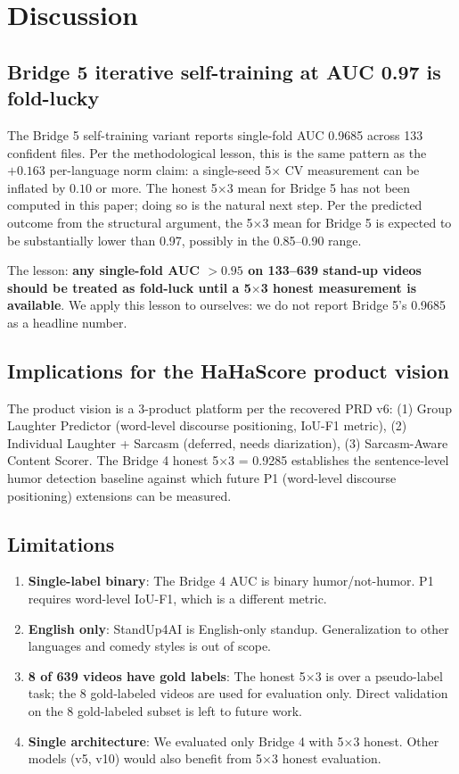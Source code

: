 \documentclass[11pt, letterpaper]{article}
\begin{document}
\section{Discussion}

\subsection{Bridge 5 iterative self-training at AUC 0.97 is fold-lucky}

The Bridge 5 self-training variant reports single-fold AUC 0.9685 across 133 confident files. Per the methodological lesson, this is the same pattern as the $+0.163$ per-language norm claim: a single-seed 5$\times$ CV measurement can be inflated by $0.10$ or more. The honest 5$\times$3 mean for Bridge 5 has not been computed in this paper; doing so is the natural next step. Per the predicted outcome from the structural argument, the 5$\times$3 mean for Bridge 5 is expected to be substantially lower than 0.97, possibly in the 0.85--0.90 range.

The lesson: \textbf{any single-fold AUC $> 0.95$ on 133--639 stand-up videos should be treated as fold-luck until a 5$\times$3 honest measurement is available}. We apply this lesson to ourselves: we do not report Bridge 5's 0.9685 as a headline number.

\subsection{Implications for the HaHaScore product vision}

The product vision is a 3-product platform per the recovered PRD v6: (1) Group Laughter Predictor (word-level discourse positioning, IoU-F1 metric), (2) Individual Laughter + Sarcasm (deferred, needs diarization), (3) Sarcasm-Aware Content Scorer. The Bridge 4 honest 5$\times$3 = 0.9285 establishes the sentence-level humor detection baseline against which future P1 (word-level discourse positioning) extensions can be measured.

\subsection{Limitations}

\begin{enumerate}
\item \textbf{Single-label binary}: The Bridge 4 AUC is binary humor/not-humor. P1 requires word-level IoU-F1, which is a different metric.
\item \textbf{English only}: StandUp4AI is English-only standup. Generalization to other languages and comedy styles is out of scope.
\item \textbf{8 of 639 videos have gold labels}: The honest 5$\times$3 is over a pseudo-label task; the 8 gold-labeled videos are used for evaluation only. Direct validation on the 8 gold-labeled subset is left to future work.
\item \textbf{Single architecture}: We evaluated only Bridge 4 with 5$\times$3 honest. Other models (v5, v10) would also benefit from 5$\times$3 honest evaluation.
\end{enumerate}
\end{document}
